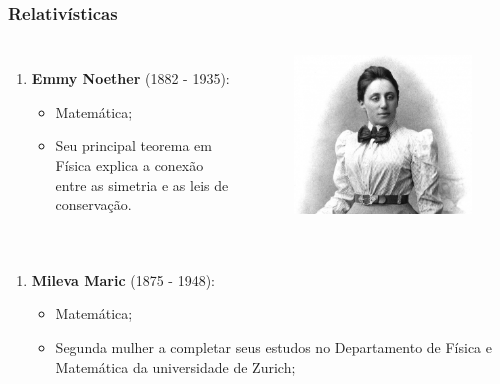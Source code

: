 \documentclass[11pt, brazil]{beamer}
\begin{document}

\begin{frame}
\frametitle{Relativísticas}
\begin{columns}
\begin{enumerate}
 \justifying
 \item {\color{crimson}\bf Emmy Noether} (1882 - 1935):
  \begin{itemize}
   \justifying
   \item Matemática;
   \item Seu principal teorema em Física explica a conexão entre as simetria e as leis de conservação.
  \end{itemize}
\end{enumerate}
\begin{figure}
 \includegraphics[scale=0.15]{figuras/noether.jpg}
\end{figure}
\end{columns}
\pause  
\begin{columns}
\begin{enumerate}
 \justifying
 \item {\color{crimson}\bf Mileva Maric} (1875 - 1948):
  \begin{itemize}
   \justifying
   \item Matemática;
   \item Segunda mulher a completar seus estudos no Departamento de Física e Matemática da universidade de Zurich;

\end{itemize}
\end{enumerate}
\end{columns}
\end{frame}
\end{document}
